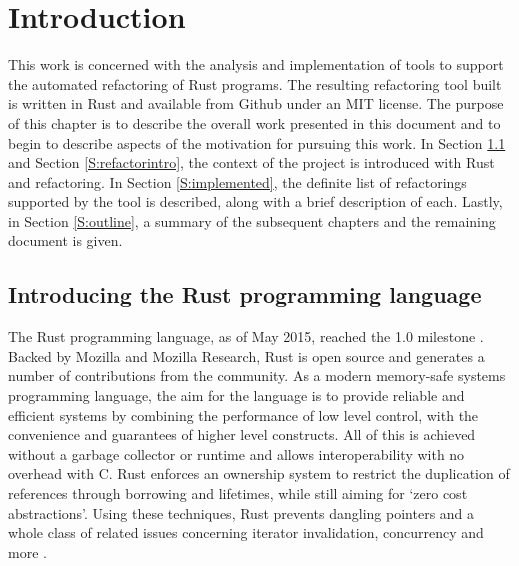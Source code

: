 \chapter{Introduction}\label{C:intro}
This work is concerned with the analysis and implementation of tools to support the automated refactoring of Rust programs. The resulting refactoring tool built is written in Rust and available from Github under an MIT license. The purpose of this chapter is to describe the overall work presented in this document and to begin to describe aspects of the motivation for pursuing this work. In Section \ref{S:rustintro} and Section \ref{S:refactorintro}, the context of the project is introduced with Rust and refactoring. In Section \ref{S:implemented}, the definite list of refactorings supported by the tool is described, along with a brief description of each. Lastly, in Section \ref{S:outline}, a summary of the subsequent chapters and the remaining document is given.


\section{Introducing the Rust programming language}\label{S:rustintro}


The Rust programming language, as of May 2015, reached the 1.0 milestone \cite{rustcore15}. Backed by Mozilla and Mozilla Research, Rust is open source and generates a number of contributions from the community. As a modern memory-safe systems programming language, the aim for the language is to provide reliable and efficient systems by combining the performance of low level control, with the convenience and guarantees of higher level constructs. All of this is achieved without a garbage collector or runtime and allows interoperability with no overhead with C. Rust enforces an ownership system to restrict the duplication of references through borrowing and lifetimes, while still aiming for `zero cost abstractions'. Using these techniques, Rust prevents dangling pointers and a whole class of related issues concerning iterator invalidation, concurrency and more \cite{rustbook15}.

